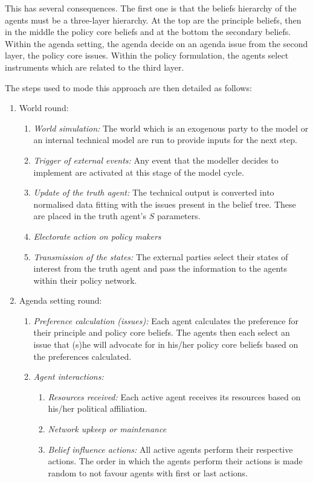 This has several consequences. The first one is that the beliefs hierarchy of the agents must be a three-layer hierarchy. At the top are the principle beliefs, then in the middle the policy core beliefs and at the bottom the secondary beliefs. Within the agenda setting, the agenda decide on an agenda issue from the second layer, the policy core issues. Within the policy formulation, the agents select instruments which are related to the third layer.

The steps used to mode this approach are then detailed as follows:

\begin{enumerate}
\item World round:
	
	\begin{enumerate}
	\item \emph{World simulation:} The world which is an exogenous party to the model or an internal technical model are run to provide inputs for the next step.
	\item \emph{Trigger of external events:} Any event that the modeller decides to implement are activated at this stage of the model cycle.
	\item \emph{Update of the truth agent:} The technical output is converted into normalised data fitting with the issues present in the belief tree. These are placed in the truth agent's $S$ parameters.
	\item \emph{Electorate action on policy makers}
	\item \emph{Transmission of the states:} The external parties select their states of interest from the truth agent and pass the information to the agents within their policy network.
	\end{enumerate}
	
\item Agenda setting round:


	\begin{enumerate}
	\item \emph{Preference calculation (issues):} Each agent calculates the preference for their principle and policy core beliefs. The agents then each select an issue that (s)he will advocate for in his/her policy core beliefs based on the preferences calculated.
	\item \emph{Agent interactions:} 

		\begin{enumerate}
		\item \emph{Resources received:} Each active agent receives its resources based on his/her political affiliation.
		\item \emph{Network upkeep or maintenance}
		\item \emph{Belief influence actions:} All active agents perform their respective actions. The order in which the agents perform their actions is made random to not favour agents with first or last actions.
		\end{enumerate}


\end{enumerate}
\end{enumerate}
